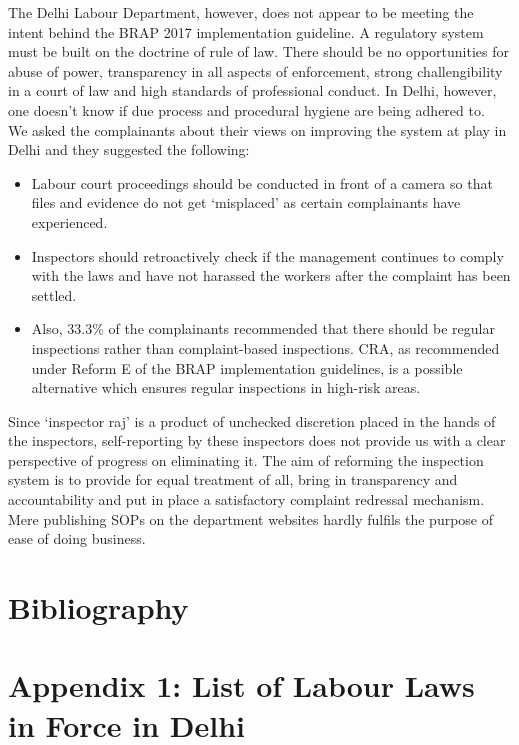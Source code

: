 \documentclass[a4paper, 12pt, twoside]{article}
\begin{document}
The Delhi Labour Department, however, does not appear to be meeting the intent behind the BRAP 2017 implementation guideline. A regulatory system must be built on the doctrine of rule of law. There should be no opportunities for abuse of power, transparency in all aspects of enforcement, strong challengibility in a court of law and high standards of professional conduct. In Delhi, however, one doesn’t know if due process and procedural hygiene are being adhered to. \\

We asked the complainants about their views on improving the system at play in Delhi and they suggested the following:
\begin{itemize}
\item Labour court proceedings should be conducted in front of a camera so that files and evidence do not get ‘misplaced’ as certain complainants have experienced.
\item Inspectors should retroactively check if the management continues to comply with the laws and have not harassed the workers after the complaint has been settled. 
\item Also, 33.3\% of the complainants recommended that there should be regular inspections rather than complaint-based inspections. CRA, as recommended under Reform E of the BRAP implementation guidelines, is a possible alternative which ensures regular inspections in high-risk areas.
\end{itemize}

Since ‘inspector raj’ is a product of unchecked discretion placed in the hands of the inspectors, self-reporting by these inspectors does not provide us with a clear perspective of progress on eliminating it. The aim of reforming the inspection system is to provide for equal treatment of all, bring in transparency and accountability and put in place a satisfactory complaint redressal mechanism. Mere publishing SOPs on the department websites hardly fulfils the purpose of ease of doing business.

\newpage
\section*{Bibliography}
\printbibliography[heading=none]
\newpage      
\section*{Appendix 1: List of Labour Laws in Force in Delhi}
\end{document}
